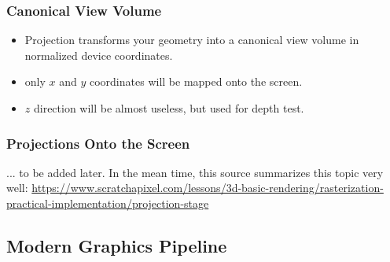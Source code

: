 \documentclass[11pt]{article}
\begin{document}
\subsubsection{Canonical View Volume}
\begin{itemize}
	\item Projection transforms your geometry into a canonical view volume in normalized device coordinates. 
	\item only $x$ and $y$ coordinates will be mapped onto the screen. 
	\item $z$ direction will be almost useless, but used for depth test. 
\end{itemize}

\subsubsection{Projections Onto the Screen}
... to be added later. In the mean time, this source summarizes this topic very well: \url{https://www.scratchapixel.com/lessons/3d-basic-rendering/rasterization-practical-implementation/projection-stage}

\subsection{Modern Graphics Pipeline}
\end{document}
